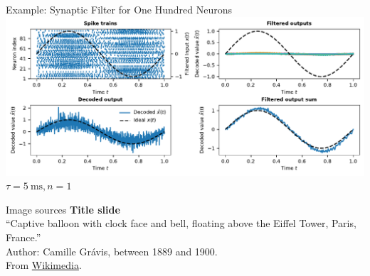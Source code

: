 \documentclass[handout,aspectratio=169]{beamer}
\begin{document}
\begin{frame}{Example: Synaptic Filter for One Hundred Neurons}
	\includegraphics[width=\textwidth]{media/n_neurons_synaptic_filter.pdf}
	\centering $\tau = \SI{5}{\milli\second}, n = 1$
\end{frame}

\backupbegin

\begin{frame}[noframenumbering]{Image sources}
	\small
	\textbf{Title slide}\\\enquote{Captive balloon with clock face and bell, floating above the Eiffel Tower, Paris, France.}\\Author: Camille Grávis, between 1889 and 1900.\\From \href{https://commons.wikimedia.org/wiki/File:Camille_Gr\%C3\%A1vis,_Captive_balloon_with_clock_face_and_bell,_floating_above_the_Eiffel_Tower,_Paris,_France.jpg}{Wikimedia}.
\end{frame}


\backupend
\end{document}
